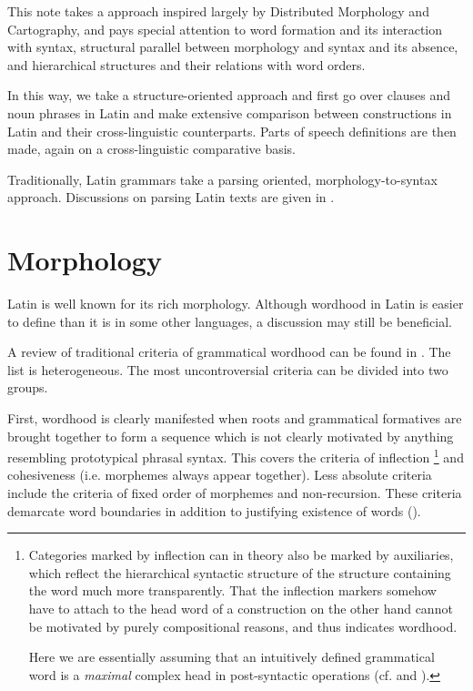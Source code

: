 \documentclass[a4paper, oneside, 12pt]{report}
\newcommand*{\citepages}[1]{pp.~{#1}}
\begin{document}
This note takes a approach inspired largely by Distributed Morphology and Cartography,
and pays special attention to word formation and its interaction with syntax,
structural parallel between morphology and syntax and its absence,
and hierarchical structures and their relations with word orders. 

In this way, we take a structure-oriented approach and first go over clauses and noun phrases in Latin and make extensive comparison between constructions in Latin and their cross-linguistic counterparts.
Parts of speech definitions are then made, again on a cross-linguistic comparative basis.

Traditionally, Latin grammars take a parsing oriented, morphology-to-syntax approach.
Discussions on parsing Latin texts are given in .

\section{Morphology}\label{sec:grammatical.word}


Latin is well known for its rich morphology.
Although wordhood in Latin is easier to define than it is in some other languages,
a discussion may still be beneficial.

A review of traditional criteria of grammatical wordhood can be found in \citet[\citepages{12-19}]{dixon2012basic3}.
The list is heterogeneous.
The most uncontroversial criteria can be divided into two groups. 

First, wordhood is clearly manifested when roots and grammatical formatives are brought together to form a sequence which is not clearly motivated by anything resembling prototypical phrasal syntax.
This covers the criteria of inflection%
\footnote{
    Categories marked by inflection can in theory also be marked by auxiliaries,
    which reflect the hierarchical syntactic structure of the structure containing the word much more transparently.
    That the inflection markers somehow have to attach to the head word of a construction on the other hand cannot be motivated by purely compositional reasons,
    and thus indicates wordhood.

    Here we are essentially assuming that an intuitively defined grammatical word is a \emph{maximal} complex head in post-syntactic operations (cf. \citealt{embick2007linearization} and \citealt{bruening2018lexicalist}).
}
and cohesiveness (i.e. morphemes always appear together).
Less absolute criteria include the criteria of fixed order of morphemes and non-recursion. 
These criteria demarcate word boundaries in addition to justifying existence of words
().
\end{document}
